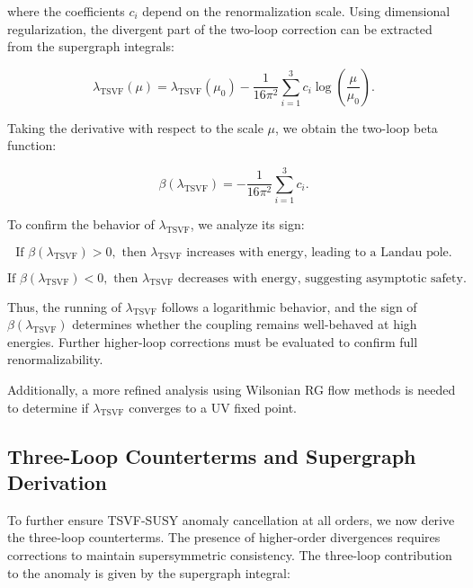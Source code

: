 \documentclass[12pt, onecolumn]{article}
\theoremstyle{definition}
\numberwithin{equation}{section}
\begin{document}
where the coefficients \( c_i \) depend on the renormalization scale. Using dimensional regularization, the divergent part of the two-loop correction can be extracted from the supergraph integrals:

\begin{equation}
    \lambda_{\text{TSVF}}(\mu) = \lambda_{\text{TSVF}}(\mu_0) - \frac{1}{16\pi^2} \sum_{i=1}^{3} c_i \log \left( \frac{\mu}{\mu_0} \right).
    \label{eq:lambda-renormalization}
\end{equation}

Taking the derivative with respect to the scale \( \mu \), we obtain the two-loop beta function:

\begin{equation}
    \beta(\lambda_{\text{TSVF}}) = -\frac{1}{16\pi^2} \sum_{i=1}^{3} c_i.
    \label{eq:two-loop-beta-result}
\end{equation}

To confirm the behavior of \( \lambda_{\text{TSVF}} \), we analyze its sign:

\begin{equation}
    \text{If } \beta(\lambda_{\text{TSVF}}) > 0, \text{ then } \lambda_{\text{TSVF}} \text{ increases with energy, leading to a Landau pole.}
    \label{eq:beta-positive}
\end{equation}

\begin{equation}
    \text{If } \beta(\lambda_{\text{TSVF}}) < 0, \text{ then } \lambda_{\text{TSVF}} \text{ decreases with energy, suggesting asymptotic safety.}
    \label{eq:beta-negative}
\end{equation}

Thus, the running of \( \lambda_{\text{TSVF}} \) follows a logarithmic behavior, and the sign of \( \beta(\lambda_{\text{TSVF}}) \) determines whether the coupling remains well-behaved at high energies. Further higher-loop corrections must be evaluated to confirm full renormalizability.

Additionally, a more refined analysis using Wilsonian RG flow methods is needed to determine if \( \lambda_{\text{TSVF}} \) converges to a UV fixed point.

\subsection{Three-Loop Counterterms and Supergraph Derivation}
\label{subsec:three-loop-counterterms}

To further ensure TSVF-SUSY anomaly cancellation at all orders, we now derive the three-loop counterterms. The presence of higher-order divergences requires corrections to maintain supersymmetric consistency. The three-loop contribution to the anomaly is given by the supergraph integral:
\end{document}
